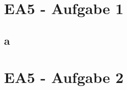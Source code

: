 \documentclass[12pt]{article}
\begin{document}
\section*{EA5 - Aufgabe 1}

\subsection*{a}


\section*{EA5 - Aufgabe 2}
\begin{figure}[h]
	\centering
	\subfigure[0]{\scalebox{.5}{}}
	\hspace{1cm}
		\centering
	\subfigure[6]{\scalebox{.5}{}}
		\hspace{1cm}
		\centering
	\subfigure[3]{\scalebox{.5}{}}
		\hspace{1cm}
		\centering
	\subfigure[9]{\scalebox{.5}{}}
\end{figure}

\begin{figure}[h]
	\centering
	\subfigure[7]{\scalebox{.5}{}}
	\hspace{1cm}
		\centering
	\subfigure[6]{\scalebox{.5}{}}
		\hspace{1cm}
		\centering
	\subfigure[Kosten: 6]{\scalebox{.5}{}}
\end{figure}
\end{document}
